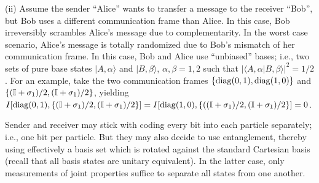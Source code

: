 (ii)
Assume the sender ``Alice'' wants to transfer a message to
the receiver ``Bob'', but Bob uses a different communication frame than Alice.
In this case, Bob irreversibly scrambles Alice's message due to complementarity.
In the worst case scenario, Alice's message
is totally randomized due to Bob's mismatch of her communication frame.
In this case, Bob and Alice use ``unbiased'' bases;
i.e., two sets of pure base states
$\vert A,\alpha \rangle$
and
$\vert B,\beta \rangle$,
$\alpha , \beta =1,  2$ such that
$\vert \langle A,\alpha \vert  B,\beta  \rangle \vert^2 = 1/2$.
For an example, take the two communication frames $\{{\rm diag} (0,1),{\rm diag} (1,0)\}$
and $\{({\Bbb I}+\sigma_1)/{2},({\Bbb I}+\sigma_1)/{2}  \}$,
yielding
$
I[{\rm diag}(0,1),\{({\Bbb I}+\sigma_1)/{2},({\Bbb I}+\sigma_1)/{2} \}]=
I[{\rm diag}(1,0),\{(({\Bbb I}+\sigma_1)/{2},({\Bbb I}+\sigma_1)/{2}\}]=0$.

Sender and receiver may stick with coding every bit into each particle separately;
i.e., one bit per particle.
But they may also decide to use entanglement, thereby
using effectively a basis set
which is rotated against the standard Cartesian basis
(recall that all basis states are unitary equivalent).
In the latter case, only measurements of joint properties
suffice to separate all states from one another.

